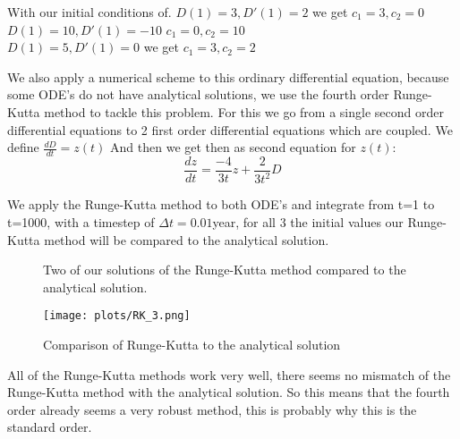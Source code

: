 With our initial conditions of.
$D(1)=3,D'(1)=2$ we get $c_1=3,c_2=0$\\
$D(1)=10,D'(1)=-10$ $c_1=0,c_2=10$\\
$D(1)=5,D'(1)=0$ we get $c_1=3,c_2=2$

We also apply a numerical scheme to this ordinary differential equation, because some ODE's do not have analytical solutions, we use the fourth order Runge-Kutta method to tackle this problem. For this we go from a single second order differential equations to 2 first order differential equations which are coupled. We define $\frac{dD}{dt}=z(t)$
And then we get then as second equation for $z(t)$:
\begin{equation}
\frac{dz}{dt}=\frac{-4}{3t}z+\frac{2}{3t^2}D
\end{equation}

We apply the Runge-Kutta method to both ODE's and integrate from t=1 to t=1000, with a timestep of $\Delta t=0.01$year, for all 3 the initial values our Runge-Kutta method will be compared to the analytical solution.

%


%


\begin{figure}
    \centering
    \qquad
    \caption{Two of our solutions of the Runge-Kutta method compared to the analytical solution.}
    \label{fig:rk}
\end{figure}

\begin{figure}[h]
   \centering
   \texttt{[image: plots/RK\_3.png]}
      \caption{Comparison of Runge-Kutta to the analytical solution}
\end{figure}


All of the Runge-Kutta methods work very well, there seems no mismatch of the Runge-Kutta method with the analytical solution. So this means that the fourth order already seems a very robust method, this is probably why this is the standard order.


